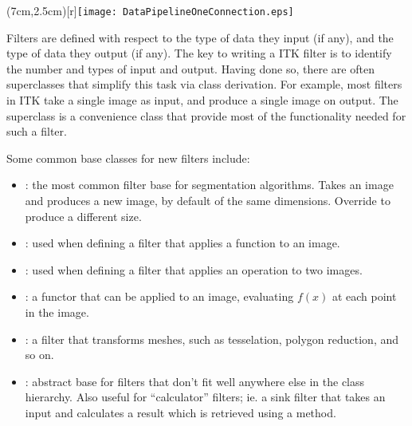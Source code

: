 \parpic(7cm,2.5cm)[r]{\texttt{[image: DataPipelineOneConnection.eps]}}


Filters are defined with respect to the type of data they input (if
any), and the type of data they output (if any). The key to writing a
ITK filter is to identify the number and types of input and
output. Having done so, there are often superclasses that simplify
this task via class derivation. For example, most filters in ITK take
a single image as input, and produce a single image on output. The
superclass  is a convenience class that
provide most of the functionality needed for such a filter.

Some common base classes for new filters include:

\begin{itemize}

  \item {}: the most common filter base for
    segmentation algorithms.  Takes an image and produces a new image, by
    default of the same dimensions.  Override
     to produce a different size.

  \item {}: used when defining a filter that
  applies a function to an image.

  \item {}: used when defining a filter that
  applies an operation to two images.

  \item {}: a functor that can be applied to an image,
  evaluating $f(x) $ at each point in the image.

  \item {}: a filter that transforms meshes, such as
  tesselation, polygon reduction, and so on.

  \item {}: abstract base for filters that don't fit well
  anywhere else in the class hierarchy.  Also useful for ``calculator''
  filters; ie. a sink filter that takes an input and calculates a result
  which is retrieved using a  method.

\end{itemize}

